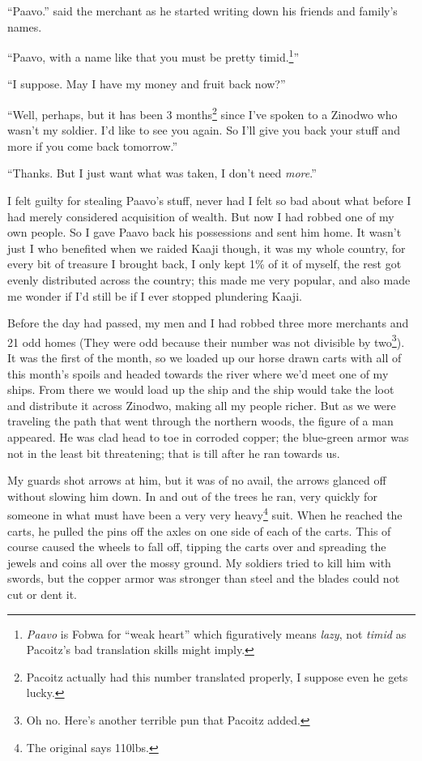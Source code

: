 ``Paavo.'' said the merchant as he started writing down his friends and family's names.

``Paavo, with a name like that you must be pretty timid.\footnote{\emph{Paavo} is Fo\-bwa for ``weak heart'' which figuratively means \emph{lazy}, not \emph{timid} as Pacoitz's bad translation skills might imply.}''

``I suppose. May I have my money and fruit back now?''

``Well, perhaps, but it has been 3 months\footnote{Pacoitz actually had this number translated properly, I suppose even he gets lucky.} since I've spoken to a Zinodwo who wasn't my soldier. I'd like to see you again. So I'll give you back your stuff and more if you come back tomorrow.''

``Thanks. But I just want what was taken, I don't need \emph{more}.''

I felt guilty for stealing Paavo's stuff, never had I felt so bad about what before I had merely considered acquisition of wealth. But now I had robbed one of my own people. So I gave Paavo back his possessions and sent him home. It wasn't just I who benefited when we raided Kaaji though, it was my whole country, for every bit of treasure I brought back, I only kept 1\% of it of myself, the rest got evenly distributed across the country; this made me very popular, and also made me wonder if I'd still be if I ever stopped plundering Kaaji.

Before the day had passed, my men and I had robbed three more merchants and 21 odd homes (They were odd because their number was not divisible by two\footnote{Oh no. Here's another terrible pun that Pacoitz added.}).
It was the first of the month, so we loaded up our horse drawn carts with all of this month's spoils and headed towards the river where we'd meet one of my ships. From there we would load up the ship and the ship would take the loot and distribute it across Zinodwo, making all my people richer.
But as we were traveling the path that went through the northern woods, the figure of a man appeared. He was clad head to toe in corroded copper; the blue-green armor was not in the least bit threatening; that is till after he ran towards us.

My guards shot arrows at him, but it was of no avail, the arrows glanced off without slowing him down. In and out of the trees he ran, very quickly for someone in what must have been a very very heavy\footnote{The original says 110lbs.} suit. When he reached the carts, he pulled the pins off the axles on one side of each of the carts. This of course caused the wheels to fall off, tipping the carts over and spreading the jewels and coins all over the mossy ground. My soldiers tried to kill him with swords, but the copper armor was stronger than steel and the blades could not cut or dent it. 

